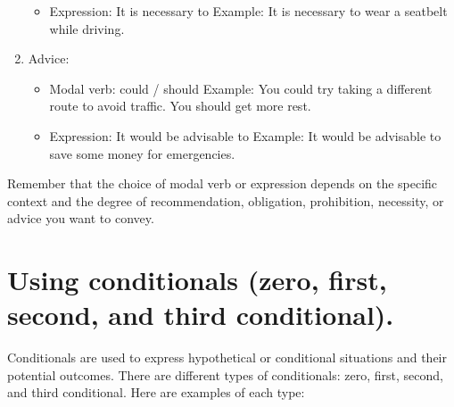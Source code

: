 \documentclass{article}
\begin{document}
\begin{enumerate}
\begin{itemize}
        \item Expression: It is necessary to
        Example: It is necessary to wear a seatbelt while driving.
    \end{itemize}
    \item Advice:
    \begin{itemize}
        \item Modal verb: could / should
        Example: You could try taking a different route to avoid traffic. You should get more rest.
        \item Expression: It would be advisable to
        Example: It would be advisable to save some money for emergencies.
    \end{itemize}
\end{enumerate}
Remember that the choice of modal verb or expression depends on the specific context and the degree of recommendation, obligation, prohibition, necessity, or advice you want to convey.

\section*{Using conditionals (zero, first, second, and third conditional).}
Conditionals are used to express hypothetical or conditional situations and their potential outcomes. There are different types of conditionals: zero, first, second, and third conditional. Here are examples of each type:
\end{document}
